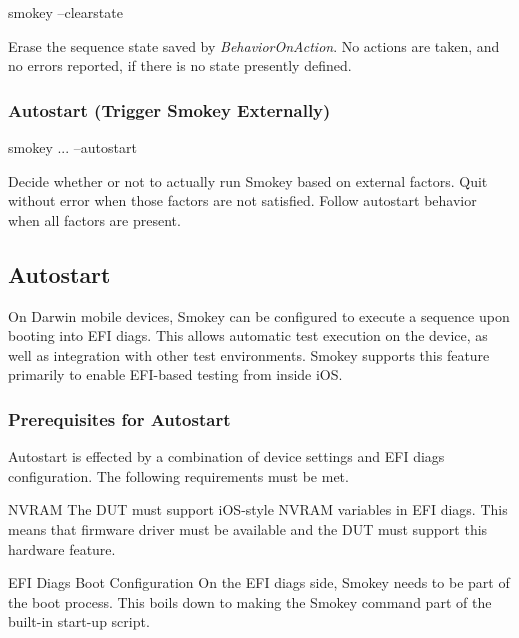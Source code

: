\documentclass[11pt]{article}
\newcommand{\prop}[1]{{\itshape#1}}
\begin{document}
\begin{CommandLine}
smokey --clearstate
\end{CommandLine}

Erase the sequence state saved by \prop{BehaviorOnAction}.  No actions are taken, and
no errors reported, if there is no state presently defined.

\subsubsection{Autostart (Trigger Smokey Externally)}

\begin{CommandLine}
smokey ... --autostart
\end{CommandLine}

Decide whether or not to actually run Smokey based on external factors.  Quit
without error when those factors are not satisfied.  Follow autostart behavior
when all factors are present.

\subsection{Autostart}

On Darwin mobile devices, Smokey can be configured to execute a sequence upon
booting into EFI diags.  This allows automatic test execution on the device, as
well as integration with other test environments.  Smokey supports this feature
primarily to enable EFI-based testing from inside iOS.

\subsubsection{Prerequisites for Autostart}

Autostart is effected by a combination of device settings and EFI diags
configuration.  The following requirements must be met.

\begin{Definition}

\item[NVRAM] The DUT must support iOS-style NVRAM variables in EFI diags.
	This means that firmware driver must be available and the DUT must
	support this hardware feature.

\item[EFI Diags Boot Configuration] On the EFI diags side, Smokey needs to be
	part of the boot process.  This boils down to making the Smokey
	command part of the built-in start-up script.  

\end{Definition}
\end{document}
